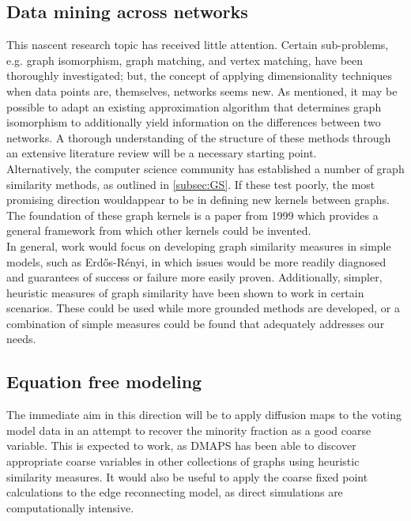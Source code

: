 \documentclass[11pt]{article}
\begin{document}
\subsection{Data mining across networks}
\indent This nascent research topic has received little attention. Certain sub-problems, e.g. graph isomorphism, graph matching, and vertex matching, have been thoroughly investigated; but, the concept of applying dimensionality techniques when data points are, themselves, networks seems new. As mentioned, it may be possible to adapt an existing approximation algorithm that determines graph isomorphism to additionally yield information on the differences between two networks. A thorough understanding of the structure of these methods through an extensive literature review will be a necessary starting point. \vspace{1mm}\\
\indent Alternatively, the computer science community has established a number of graph similarity methods, as outlined in \ref{subsec:GS}. If these test poorly, the most promising direction wouldappear to be in defining new kernels between graphs. The foundation of these graph kernels is a paper from 1999 \cite{Haussler1999} which provides a general framework from which other kernels could be invented. \vspace{1mm}\\
\indent In general, work would focus on developing graph similarity measures in simple models, such as Erd\H{o}s-R\'{e}nyi, in which issues would be more readily diagnosed and guarantees of success or failure more easily proven. Additionally, simpler, heuristic measures of graph similarity have been shown to work in certain scenarios. These could be used while more grounded methods are developed, or a combination of simple measures could be found that adequately addresses our needs.
\subsection{Equation free modeling}
\indent The immediate aim in this direction will be to apply diffusion maps to the voting model data in an attempt to recover the minority fraction as a good coarse variable. This is expected to work, as DMAPS has been able to discover appropriate coarse variables in other collections of graphs using heuristic similarity measures. It would also be useful to apply the coarse fixed point calculations to the edge reconnecting model, as direct simulations are computationally intensive.



\end{document}
